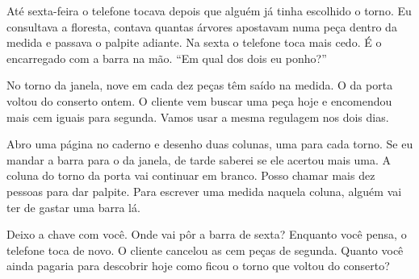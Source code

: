 Até sexta-feira o telefone tocava depois que alguém já tinha escolhido o torno. Eu consultava a floresta, contava quantas árvores apostavam numa peça dentro da medida e passava o palpite adiante. Na sexta o telefone toca mais cedo. É o encarregado com a barra na mão. “Em qual dos dois eu ponho?”

No torno da janela, nove em cada dez peças têm saído na medida. O da porta voltou do conserto ontem. O cliente vem buscar uma peça hoje e encomendou mais cem iguais para segunda. Vamos usar a mesma regulagem nos dois dias.

Abro uma página no caderno e desenho duas colunas, uma para cada torno. Se eu mandar a barra para o da janela, de tarde saberei se ele acertou mais uma. A coluna do torno da porta vai continuar em branco. Posso chamar mais dez pessoas para dar palpite. Para escrever uma medida naquela coluna, alguém vai ter de gastar uma barra lá.

Deixo a chave com você. Onde vai pôr a barra de sexta? Enquanto você pensa, o telefone toca de novo. O cliente cancelou as cem peças de segunda. Quanto você ainda pagaria para descobrir hoje como ficou o torno que voltou do conserto?
